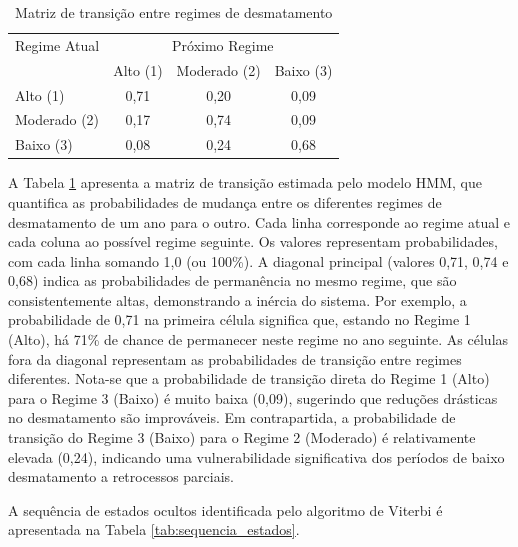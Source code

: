 \documentclass[12pt,a4paper]{article}
\begin{document}
\begin{table}[htbp]
\centering
\caption{Matriz de transição entre regimes de desmatamento}
\label{tab:matriz_transicao}
\begin{tabular}{lccc}
\toprule
Regime Atual & \multicolumn{3}{c}{Próximo Regime} \\
\cmidrule(lr){2-4}
             & Alto (1) & Moderado (2) & Baixo (3) \\
\midrule
Alto (1)     & 0,71     & 0,20         & 0,09      \\
Moderado (2) & 0,17     & 0,74         & 0,09      \\
Baixo (3)    & 0,08     & 0,24         & 0,68      \\
\bottomrule
\end{tabular}
\end{table}

A Tabela \ref{tab:matriz_transicao} apresenta a matriz de transição estimada pelo modelo HMM, que quantifica as probabilidades de mudança entre os diferentes regimes de desmatamento de um ano para o outro. Cada linha corresponde ao regime atual e cada coluna ao possível regime seguinte. Os valores representam probabilidades, com cada linha somando 1,0 (ou 100\%). A diagonal principal (valores 0,71, 0,74 e 0,68) indica as probabilidades de permanência no mesmo regime, que são consistentemente altas, demonstrando a inércia do sistema. Por exemplo, a probabilidade de 0,71 na primeira célula significa que, estando no Regime 1 (Alto), há 71\% de chance de permanecer neste regime no ano seguinte. As células fora da diagonal representam as probabilidades de transição entre regimes diferentes. Nota-se que a probabilidade de transição direta do Regime 1 (Alto) para o Regime 3 (Baixo) é muito baixa (0,09), sugerindo que reduções drásticas no desmatamento são improváveis. Em contrapartida, a probabilidade de transição do Regime 3 (Baixo) para o Regime 2 (Moderado) é relativamente elevada (0,24), indicando uma vulnerabilidade significativa dos períodos de baixo desmatamento a retrocessos parciais.

A sequência de estados ocultos identificada pelo algoritmo de Viterbi é apresentada na Tabela \ref{tab:sequencia_estados}.
\end{document}
